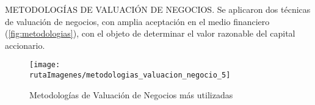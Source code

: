 

\textcolor{secundario}{METODOLOG\'IAS DE VALUACI\'ON DE NEGOCIOS}. Se aplicaron dos t\'ecnicas de valuaci\'on de negocios, con amplia aceptaci\'on en el medio financiero (\autoref{fig:metodologias}), con el objeto de determinar el \textcolor{principal}{valor razonable del capital accionario}.\\

\begin{figure}[H]
\centering
\caption{Metodolog\'ias de Valuaci\'on de Negocios m\'as utilizadas\label{fig:metodologias}}
\texttt{[image: \\rutaImagenes/metodologias\_valuacion\_negocio\_5]}\\

\end{figure}
